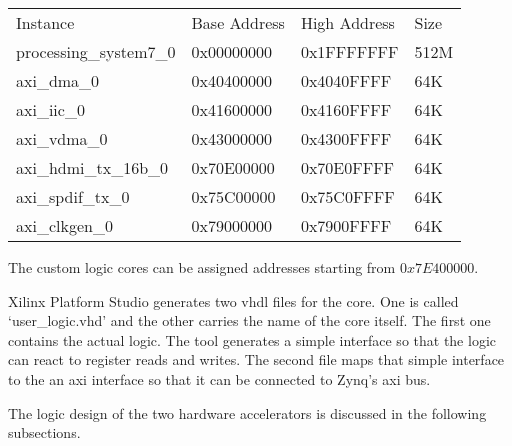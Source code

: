 \begin{tabular}{llll}
	Instance                & Base Address & High Address & Size\\
	processing\_system7\_0  & 0x00000000   & 0x1FFFFFFF   & 512M\\
	axi\_dma\_0             & 0x40400000   & 0x4040FFFF   & 64K\\
	axi\_iic\_0             & 0x41600000   & 0x4160FFFF   & 64K\\
	axi\_vdma\_0            & 0x43000000   & 0x4300FFFF   & 64K\\
	axi\_hdmi\_tx\_16b\_0   & 0x70E00000   & 0x70E0FFFF   & 64K\\
	axi\_spdif\_tx\_0       & 0x75C00000   & 0x75C0FFFF   & 64K\\
	axi\_clkgen\_0          & 0x79000000   & 0x7900FFFF   & 64K
\end{tabular}

The custom logic cores can be assigned addresses starting from $0x7E400000$.

Xilinx Platform Studio generates two \gls{vhdl} files for the core.
One is called `user\_logic.vhd' and the other carries the name of the core
itself.
The first one contains the actual logic.
The tool generates a simple interface so that the logic can react to register
reads and writes.
The second file maps that simple interface to the an \gls{axi} interface so that
it can be connected to Zynq's \gls{axi} bus.

The logic design of the two hardware accelerators is discussed in the following
subsections.
